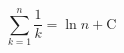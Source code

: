 \documentclass[nofonts]{ctexart}
\begin{document}
\begin{equation}
	\sum_{k=1}^n \frac{1}{k} = \ln{n} + \mathrm{C}
\end{equation}
\end{document}

